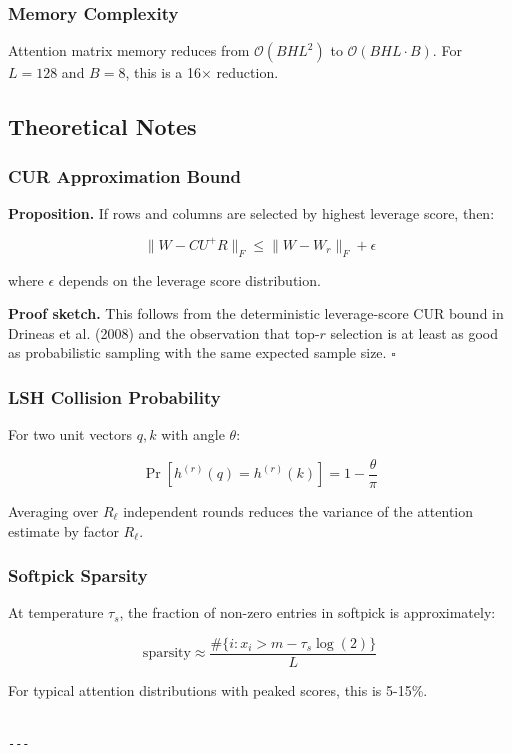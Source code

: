 \subsubsection{Memory Complexity}

Attention matrix memory reduces from $\mathcal{O}(B H L^2)$ to 
$\mathcal{O}(B H L \cdot B)$. For $L = 128$ and $B = 8$, this is a 16$\times$ reduction.

\subsection{Theoretical Notes}

\subsubsection{CUR Approximation Bound}

\textbf{Proposition.} If rows and columns are selected by highest leverage score, then:

\[
\|W - C U^+ R\|_F \leq \|W - W_r\|_F + \epsilon
\tag{4.27}
\]

where $\epsilon$ depends on the leverage score distribution.

\textbf{Proof sketch.} This follows from the deterministic leverage-score CUR bound 
in Drineas et al. (2008) and the observation that top-$r$ selection is at least 
as good as probabilistic sampling with the same expected sample size. $\square$

\subsubsection{LSH Collision Probability}

For two unit vectors $q, k$ with angle $\theta$:

\[
\Pr[h^{(r)}(q) = h^{(r)}(k)] = 1 - \frac{\theta}{\pi}
\tag{4.28}
\]

Averaging over $R_\ell$ independent rounds reduces the variance of the 
attention estimate by factor $R_\ell$.

\subsubsection{Softpick Sparsity}

At temperature $\tau_s$, the fraction of non-zero entries in softpick is 
approximately:

\[
\text{sparsity} \approx \frac{\#\{i : x_i > m - \tau_s \log(2)\}}{L}
\tag{4.29}
\]

For typical attention distributions with peaked scores, this is 5-15\%.
\begin{lstlisting}

---
\end{lstlisting}
